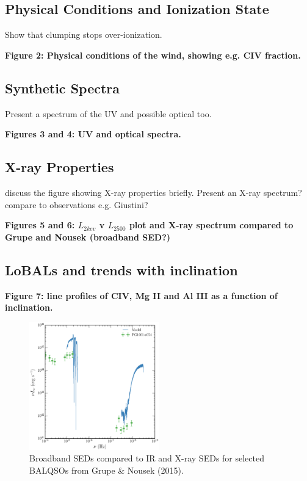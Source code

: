 \documentclass[useAMS,usenatbib]{mn2e_x}
\begin{document}
\subsection{Physical Conditions and Ionization State}

Show that clumping stops over-ionization.


{\bf Figure 2: Physical conditions of the wind, showing e.g. CIV fraction.} 

\subsection{Synthetic Spectra}

Present a spectrum of the UV and possible optical too. 


{\bf Figures 3 and 4: UV and optical spectra.} 

\subsection{X-ray Properties}

discuss the figure showing X-ray properties briefly. 
Present an X-ray spectrum? compare to observations e.g. Giustini?

{\bf Figures 5 and 6: $L_{2kev}$ v $L_{2500}$ plot and X-ray spectrum compared to Grupe and Nousek (broadband SED?)} 

\subsection{LoBALs and trends with inclination}

{\bf Figure 7: line profiles of CIV, Mg II and Al III as a function of inclination.} 


\begin{figure}
\centering
\includegraphics[width=0.5\textwidth]{figures/xray_spectrum_lnu.eps}
\caption
{
Broadband SEDs compared to IR and X-ray SEDs for selected BALQSOs 
from Grupe \& Nousek (2015).
}
\label{fig:xray}
\end{figure}
\end{document}
